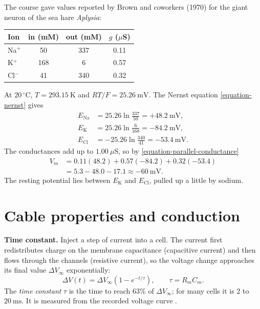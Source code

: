 \begin{example}
\label{example-aplysia}
The course gave values reported by
Brown and coworkers (1970) for the giant
neuron of the sea hare \emph{Aplysia}:
\begin{center}
\begin{tabular}{lccc}
Ion & in (mM) & out (mM)
& $g$ ($\mu$S) \\
\hline
Na$^+$ & 50 & 337 & 0.11 \\
K$^+$ & 168 & 6 & 0.57 \\
Cl$^-$ & 41 & 340 & 0.32 \\
\end{tabular}
\end{center}
At $20\,^{\circ}\mathrm{C}$,
$T = 293.15\ \mathrm{K}$ and $RT/F =
25.26\ \mathrm{mV}$. The Nernst equation
\eqref{equation-nernst} gives
$$
\begin{aligned}
E_{\mathrm{Na}} &= 25.26
\ln\frac{337}{50}
= +48.2\ \mathrm{mV}, \\
E_{\mathrm{K}} &= 25.26
\ln\frac{6}{168}
= -84.2\ \mathrm{mV}, \\
E_{\mathrm{Cl}} &= -25.26
\ln\frac{340}{41}
= -53.4\ \mathrm{mV}.
\end{aligned}
$$
The conductances add up to $1.00\
\mu\mathrm{S}$, so by
\eqref{equation-parallel-conductance}
$$
\begin{aligned}
V_m &= 0.11(48.2) + 0.57(-84.2)
+ 0.32(-53.4) \\
&= 5.3 - 48.0 - 17.1
\approx -60\ \mathrm{mV}.
\end{aligned}
$$
The resting potential lies between
$E_{\mathrm{K}}$ and $E_{\mathrm{Cl}}$,
pulled up a little by sodium.
\end{example}

\section{Cable properties and conduction}
\label{section-cable}

\textbf{Time constant.}
Inject a step of current into a cell. The
current first redistributes charge on the
membrane capacitance (capacitive current)
and then flows through the channels
(resistive current), so the voltage
change approaches its final value
$\Delta V_\infty$ exponentially:
$$
\Delta V(t) = \Delta V_\infty
\left(1 - e^{-t/\tau}\right),
\qquad \tau = R_m C_m .
$$
The \emph{time constant} $\tau$ is the
time to reach $63\%$ of $\Delta V_\infty$;
for many cells it is $2$ to $20\
\mathrm{ms}$. It is measured from the
recorded voltage curve
\cite[Chapter 12]{hill2012animal}.

